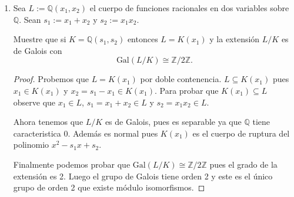 \documentclass[letter,twoside,12pt]{article}
\begin{document}
\begin{enumerate}
\begin{enumerate}
\item Sea $ L := \mathbb{Q}(x_1, x_2) $ el cuerpo de funciones racionales en dos variables sobre $ \mathbb{Q} $. Sean $ s_1 := x_1 + x_2 $ y
$ s_2 := x_1x_2 $.

Muestre que si $ K = \mathbb{Q}(s_1,s_2) $ entonces $ L = K(x_1) $ y la extensión $ L/K $ es de Galois con
\begin{equation}
\text{Gal}(L/K) \cong \mathbb{Z}/2\mathbb{Z}. \nonumber
\end{equation}

\begin{proof}
Probemos que $ L = K(x_1) $ por doble contenencia. $ L \subseteq K(x_1) $ pues $ x_1 \in K(x_1) $ y $ x_2 =s_1-x_1 \in K(x_1) $. Para probar que $ K(x_1) \subseteq L $ observe que $ x_1 \in L $, $ s_1 = x_1+x_2 \in L $ y $ s_2=x_1x_2 \in L $.

Ahora tenemos que $ L/K $ es de Galois, pues es separable ya que $ \mathbb{Q} $ tiene caracteristica 0. Además es normal pues $ K(x_1) $ es el cuerpo de ruptura del polinomio $ x^2-s_1x+s_2 $.

Finalmente podemos probar que $ \text{Gal}(L/K) \cong \mathbb{Z}/2\mathbb{Z} $ pues el grado de la extensión es 2. Luego el grupo de Galois tiene orden 2 y este es el único grupo de orden 2 que existe módulo isomorfismos.
\end{proof}
\end{enumerate}
\end{enumerate}
\end{document}
